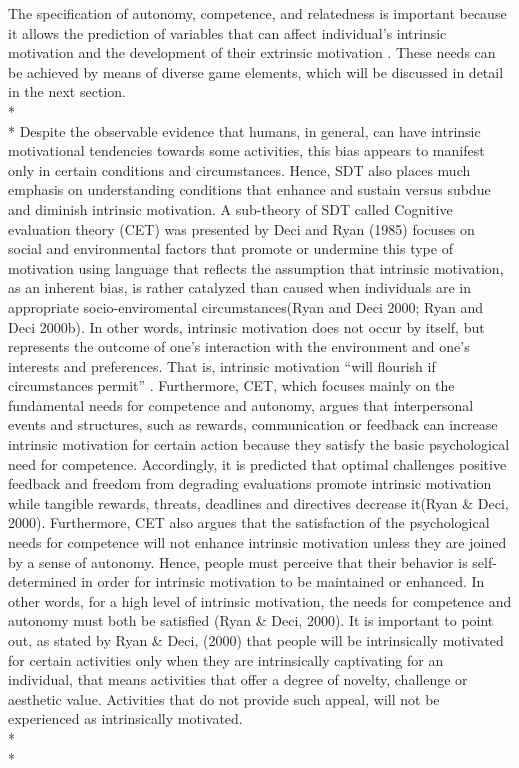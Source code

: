 The specification of autonomy, competence, and relatedness is important because it allows the prediction of variables that can affect individual's intrinsic motivation and the development of their extrinsic motivation \cite{deci1994promoting}. These needs can be achieved by means of diverse game elements, which will be discussed in detail in the next section.\\*\\*
Despite the observable evidence that humans, in general, can have intrinsic motivational tendencies towards some activities, this bias appears to manifest only in certain conditions and circumstances. Hence, SDT also places much emphasis on understanding conditions that enhance and sustain versus subdue and diminish intrinsic motivation.  A sub-theory of SDT called Cognitive evaluation  theory (CET) was presented by Deci and Ryan (1985) focuses on social and environmental factors that promote or undermine this type of motivation using language that reflects the assumption that intrinsic motivation, as an inherent bias, is rather catalyzed than caused when individuals are in appropriate socio-enviromental circumstances(Ryan  and  Deci  2000;  Ryan and Deci 2000b). In other words, intrinsic motivation does not occur by itself, but represents the outcome of one's interaction with the environment and one's interests and preferences. That is, intrinsic motivation ``will flourish if circumstances permit'' \cite{ryan2000self}. Furthermore, CET, which focuses mainly on the fundamental needs for competence and autonomy, argues that interpersonal events and structures, such as rewards, communication or feedback can increase intrinsic motivation for certain action because they satisfy the basic psychological need for competence. Accordingly, it is predicted that optimal challenges positive feedback and freedom from degrading evaluations promote intrinsic motivation while tangible rewards, threats,  deadlines  and  directives  decrease it(Ryan \& Deci, 2000). Furthermore, CET also argues that the satisfaction of the psychological needs for competence will not enhance intrinsic motivation unless they are joined by a sense of autonomy. Hence, people must perceive that their behavior is self-determined in order for intrinsic motivation to be maintained or enhanced. In other words, for a high level of intrinsic motivation, the needs for competence and autonomy must both be satisfied (Ryan \& Deci, 2000). It is important to point out, as stated by Ryan \& Deci, (2000) that people will be intrinsically motivated for certain activities only when they are intrinsically captivating for an individual, that means activities that offer a degree of novelty, challenge or aesthetic value. Activities that do not provide such appeal, will not be experienced as intrinsically motivated. \\*\\*
